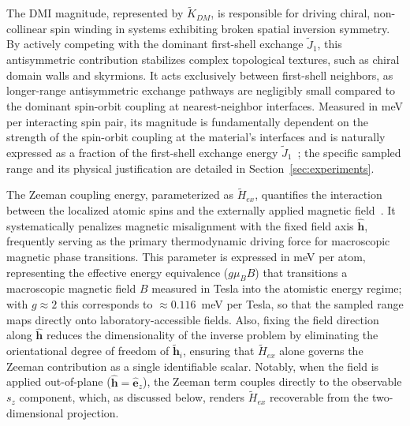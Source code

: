 \documentclass[final,5p,times,twocolumn]{elsarticle}
\begin{document}
The DMI magnitude, represented by $\tilde{K}_{DM}$, is responsible for driving chiral, non-collinear spin winding in systems exhibiting broken spatial inversion symmetry. By actively competing with the dominant first-shell exchange $\tilde{J}_1$, 
this antisymmetric contribution stabilizes complex topological textures, such as chiral domain walls and skyrmions. It acts exclusively between first-shell neighbors, as longer-range antisymmetric exchange pathways are negligibly small compared to the dominant spin-orbit coupling at nearest-neighbor interfaces. Measured in meV per interacting spin pair, its magnitude is fundamentally dependent on the strength of the spin-orbit coupling
at the material's interfaces and is naturally expressed as a fraction of the first-shell exchange energy $\tilde{J}_1$~\cite{bogdanov2020physical}; the specific sampled range and its physical justification are detailed in Section~\ref{sec:experiments}.

The Zeeman coupling energy, parameterized as $\tilde{H}_{ex}$, quantifies the interaction between the localized atomic spins and the externally applied magnetic field~\cite{goerzen2022atomistic}. It systematically 
penalizes magnetic misalignment with the fixed field axis $\hat{\mathbf{h}}$, frequently serving as the primary thermodynamic driving force for macroscopic magnetic phase transitions. This
parameter is expressed in meV per atom, representing the effective energy equivalence ($g\mu_B B$) that transitions a macroscopic magnetic field $B$ measured in Tesla into the atomistic energy regime; with $g\approx2$ this corresponds to $\approx 0.116$~meV per Tesla, so that the sampled range maps directly onto laboratory-accessible fields. Also, fixing the field direction along $\hat{\mathbf{h}}$ reduces the dimensionality of the inverse problem by eliminating the orientational degree of freedom of $\tilde{\mathbf{h}}_i$, ensuring that $\tilde{H}_{ex}$ alone governs the Zeeman contribution as a single identifiable scalar. Notably, when the field is applied out-of-plane ($\hat{\mathbf{h}} = \hat{\mathbf{e}}_z$), the Zeeman term couples directly to the observable $s_z$ component, which, as discussed below, renders $\tilde{H}_{ex}$ recoverable from the two-dimensional projection.
\end{document}
